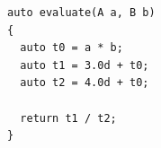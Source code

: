 \documentclass[a4paper,10pt]{article}
\begin{document}
\begin{lstlisting}[caption={\texttt{c0} and \texttt{c1} (from Listing \ref{lst:exprtree}) are now replaced by literals, but this should not effect the generated types of \texttt{t1} and \texttt{t2}.}, label=lst:exprtreetmp]
auto evaluate(A a, B b)
{
  auto t0 = a * b;
  auto t1 = 3.0d + t0;
  auto t2 = 4.0d + t0;

  return t1 / t2;
}
\end{lstlisting}


\end{document}
